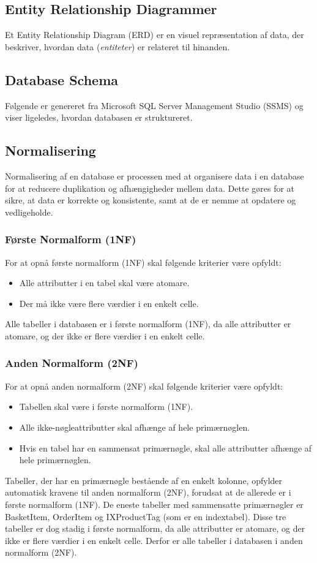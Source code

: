 \subsection{Entity Relationship Diagrammer}
Et Entity Relationship Diagram (ERD) er en visuel repræsentation af data, der beskriver, hvordan data (\emph{entiteter}) er relateret til hinanden.

\subsection{Database Schema}
Følgende er genereret fra Microsoft SQL Server Management Studio (SSMS) og viser ligeledes, hvordan databasen er struktureret.

\subsection{Normalisering}
\label{sec:normalisering}
Normalisering af en database er processen med at organisere data i en database for at reducere duplikation og afhængigheder mellem data. 
Dette gøres for at sikre, at data er korrekte og konsistente, samt at de er nemme at opdatere og vedligeholde.

\subsubsection{Første Normalform (1NF)}
For at opnå første normalform (1NF) skal følgende kriterier være opfyldt:
\begin{itemize}
    \item Alle attributter i en tabel skal være atomare.
    \item Der må ikke være flere værdier i en enkelt celle.
\end{itemize}
Alle tabeller i databasen er i første normalform (1NF), da alle attributter er atomare, og der ikke er flere værdier i en enkelt celle.

\subsubsection{Anden Normalform (2NF)}
For at opnå anden normalform (2NF) skal følgende kriterier være opfyldt:
\begin{itemize}
    \item Tabellen skal være i første normalform (1NF).
    \item Alle ikke-nøgleattributter skal afhænge af hele primærnøglen.
    \item Hvis en tabel har en sammensat primærnøgle, skal alle attributter afhænge af hele primærnøglen.
\end{itemize}
Tabeller, der har en primærnøgle bestående af en enkelt kolonne, opfylder automatisk kravene til anden normalform (2NF), forudsat at de allerede er i første normalform (1NF).
De eneste tabeller med sammensatte primærnøgler er BasketItem, OrderItem og IXProductTag (som er en indextabel).
Disse tre tabeller er dog stadig i første normalform, da alle attributter er atomare, og der ikke er flere værdier i en enkelt celle.
Derfor er alle tabeller i databasen i anden normalform (2NF).

